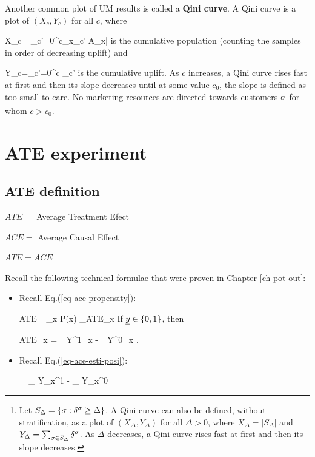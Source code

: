 Another common plot of UM results is
called a {\bf Qini
curve}.
A Qini curve is a plot 
of $(X_c,Y_c)$
for all $c$, where

\beq
X_c= \sum_{c'=0}^{c}\sum_{x\in \calx_{c'}}|A_x|
\eeq
is the cumulative population (counting the
samples in
order of decreasing uplift) and

\beq
Y_c=\sum_{c'=0}^c \Delta_{c'}
\eeq
is the cumulative uplift.
As $c$ increases, a Qini curve rises fast at first and then its slope decreases until
at some value $c_0$, the slope is defined as too small to care. No marketing resources are
directed towards
customers $\sigma$ for whom  $c>c_0$.\footnote{
Let 
$S_{\Delta} = \{\sigma:\delta^\sigma \geq \Delta\}$.
A Qini curve can also be defined, without stratification,
as a
 plot of $(X_\Delta, Y_\Delta)$ for all $\Delta>0$,
where $
X_\Delta = |S_{\Delta}|$
and
$
Y_\Delta= \sum_{\sigma\in S_{\Delta}}\delta^\sigma
$. As $\Delta$ decreases, a Qini curve rises fast at first and then its slope decreases.
}

\section{ATE experiment}
\subsection{ATE definition}

$ATE=$ Average Treatment Efect

$ACE =$ Average Causal Effect

$ATE=ACE$

Recall
the following technical formulae
that were proven in 
Chapter \ref{ch-pot-out}:



\begin{itemize}

\item
Recall Eq.(\ref{eq-ace-propensity}):

\beq
ATE =\sum_x P(x)
_{ATE_x}
\eeq
If $\rvy\in \bool$, then

\beq
ATE_x
=
_{\displaystyle Y^1_x}
-
_{\displaystyle Y^0_x}
\;.
\eeq

\item
Recall 
Eq.(\ref{eq-ace-esti-posi}):

\beq
{}
=
_
{\displaystyle Y_x^1}
-
_
{\displaystyle Y_x^0}
\label{eq-est-ace-uplift}
\eeq

\end{itemize}

